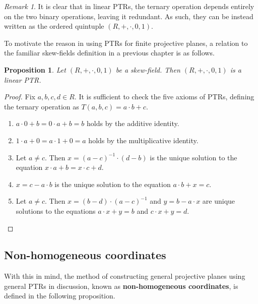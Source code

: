 \documentclass{report}
\newtheorem{proposition}[theorem]{Proposition}
\theoremstyle{definition}\newtheorem*{definition}{Definition}
\theoremstyle{definition}\newtheorem*{example}{Example}
\theoremstyle{remark}\newtheorem*{remark}{Remark}
\begin{document}
\begin{remark}
It is clear that in linear PTRs, the ternary operation depends entirely on the two binary operations, leaving it redundant. As such, they can be instead written as the ordered quintuple $ (R, +, \cdot, 0, 1) $.
\end{remark}

To motivate the reason in using PTRs for finite projective planes, a relation to the familiar skew-fields definition in a previous chapter is as follows.

\begin{proposition}
Let $ (R, +, \cdot, 0, 1) $ be a skew-field. Then $ (R, +, \cdot, 0, 1) $ is a linear PTR.
\end{proposition}

\begin{proof}
Fix $ a, b, c, d \in R $. It is sufficient to check the five axioms of PTRs, defining the ternary operation as $ T(a, b, c) = a \cdot b + c $.
\begin{enumerate}
  \item $ a \cdot 0 + b = 0 \cdot a + b = b $ holds by the additive identity.
  \item $ 1 \cdot a + 0 = a \cdot 1 + 0 = a $ holds by the multiplicative identity.
  \item Let $ a \ne c $. Then $ x = (a - c)^{-1} \cdot (d - b) $ is the unique solution to the equation $ x \cdot a + b = x \cdot c + d $.
  \item $ x = c - a \cdot b $ is the unique solution to the equation $ a \cdot b + x = c $.
  \item Let $ a \ne c $. Then $ x = (b - d) \cdot (a - c)^{-1} $ and $ y = b - a \cdot x $ are unique solutions to the equations $ a \cdot x + y = b $ and $ c \cdot x + y = d $.
\end{enumerate}
\end{proof}

\subsection{Non-homogeneous coordinates}

With this in mind, the method of constructing general projective planes using general PTRs in discussion, known as \textbf{non-homogeneous coordinates}, is defined in the following proposition.
\end{document}
